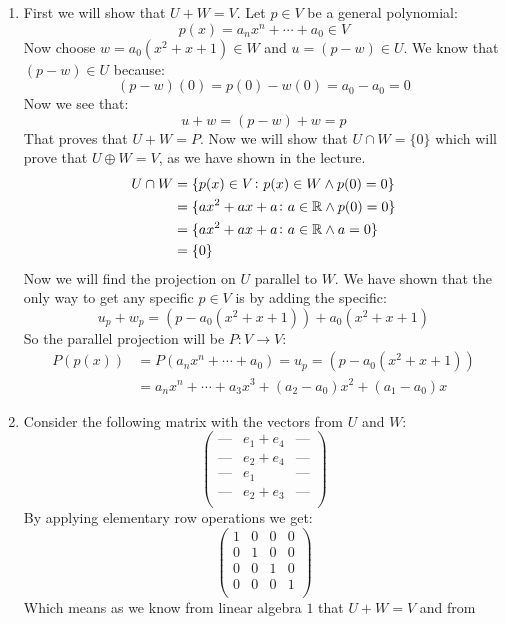 \documentclass[11pt, a4paper]{article}
\begin{document}
\begin{solution} \phantom{}
\begin{enumerate}
\item[(1)]
  First we will show that $U + W = V$. Let $p \in V$ be a general polynomial:
  \[
    p(x) = a_nx^n + \cdots + a_0 \in V
  \]
  Now choose $w = a_0(x^2+x+1) \in W$ and $u = (p-w) \in U$.
  We know that $(p-w)\in U$ because: 
  \[
    (p-w)(0) = p(0) - w(0) = a_0 - a_0 = 0
  \]
  Now we see that: 
  \[
    u + w = (p-w) + w = p
  \]
  That proves that $U + W = P$. Now we will show that $U \cap W = \{0\}$
  which will prove that $U \oplus W = V$, as we have shown in the lecture.
  \begin{align*}
    U \cap W &= \{p(x)\in V \colon p(x)\in W \land p(0) = 0\} \\
    &= \{ax^2+ax+a \colon a \in \mathbb{R} \land p(0) = 0\} \\
    &= \{ax^2+ax+a \colon a \in \mathbb{R} \land a = 0\} \\
    &= \{0\}
  \end{align*}
  Now we will find the projection on $U$ parallel to $W$. We have shown that
  the only way to get any specific $p\in V$ is by adding the specific:
  \[
    u_p + w_p = (p-a_0(x^2+x+1)) + a_0(x^2+x+1)
  \]
  So the parallel projection will be $P \colon V\to V$:
  \begin{align*}
    P(p(x)) &= P(a_nx^n + \cdots + a_0) = u_p = (p-a_0(x^2+x+1)) \\
    &= a_nx^n + \cdots + a_3x^3 + (a_2-a_0)x^2 + (a_1-a_0)x
  \end{align*}
\item[(2)]
  Consider the following matrix with the vectors from $U$ and $W$:
  \[ \begin{pmatrix}
  \text{---} & e_1+e_4 & \text{---}\\
  \text{---} & e_2+e_4 & \text{---}\\
  \text{---} & e_1 & \text{---}\\
  \text{---} & e_2+e_3 & \text{---}\\
  \end{pmatrix} \]
  By applying elementary row operations we get:
  \[ \begin{pmatrix}
  1 & 0 & 0 & 0\\
  0 & 1 & 0 & 0\\
  0 & 0 & 1 & 0\\
  0 & 0 & 0 & 1\\
  \end{pmatrix} \]
  Which means as we know from linear algebra $1$ that $U + W = V$ and from

\end{enumerate}
\end{solution}
\end{document}
